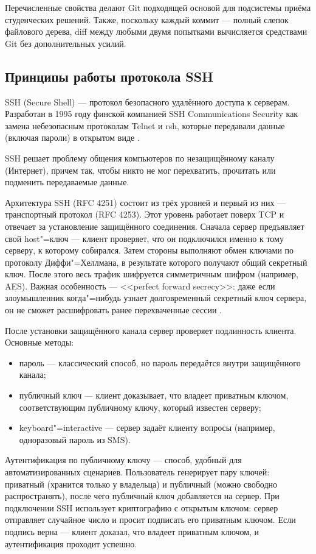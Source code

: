 \documentclass[coursework]{SCWorks}
\newcommand{\quot}[1]{<<#1>>}
\begin{document}
Перечисленные свойства делают Git подходящей основой для подсистемы приёма студенческих решений. Также, поскольку каждый коммит --- полный слепок файлового дерева, diff между любыми двумя попытками вычисляется средствами Git без дополнительных усилий.

\subsection{Принципы работы протокола SSH}

SSH (Secure Shell) --- протокол безопасного удалённого доступа к серверам. Разработан в 1995 году финской компанией SSH Communications Security как замена небезопасным протоколам Telnet и rsh, которые передавали данные (включая пароли) в открытом виде \cite{rfc4251}.

SSH решает проблему общения компьютеров по незащищённому каналу (Интернет), причем так, чтобы никто не мог перехватить, прочитать или подменить передаваемые данные.

Архитектура SSH (RFC 4251) состоит из трёх уровней и первый из них --- транспортный протокол (RFC 4253). Этот уровень работает поверх TCP и отвечает за установление защищённого соединения. Сначала сервер предъявляет свой host"=ключ --- клиент проверяет, что он подключился именно к тому серверу, к которому собирался. Затем стороны выполняют обмен ключами по протоколу Диффи"=Хеллмана, в результате которого получают общий секретный ключ. После этого весь трафик шифруется симметричным шифром (например, AES). Важная особенность --- \quot{perfect forward secrecy}: даже если злоумышленник когда"=нибудь узнает долговременный секретный ключ сервера, он не сможет расшифровать ранее перехваченные сессии \cite{rfc4253}.

После установки защищённого канала сервер проверяет подлинность клиента. Основные методы:
\begin{itemize}
	\item пароль --- классический способ, но пароль передаётся внутри защищённого канала;
	\item публичный ключ --- клиент доказывает, что владеет приватным ключом, соответствующим публичному ключу, который известен серверу;
	\item keyboard"=interactive --- сервер задаёт клиенту вопросы (например, одноразовый пароль из SMS).
\end{itemize}

Аутентификация по публичному ключу --- способ, удобный для автоматизированных сценариев. Пользователь генерирует пару ключей: приватный (хранится только у владельца) и публичный (можно свободно распространять), после чего публичный ключ добавляется на сервер. При подключении SSH использует криптографию с открытым ключом: сервер отправляет случайное число и просит подписать его приватным ключом. Если подпись верна --- клиент доказал, что владеет приватным ключом, и аутентификация проходит успешно.
\end{document}
